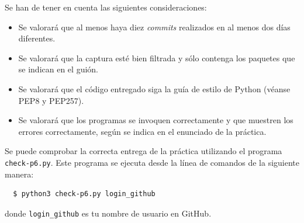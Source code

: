 \documentclass[a4paper,11pt]{article}
\begin{document}
Se han de tener en cuenta las siguientes consideraciones:
\begin{itemize}
  \item Se valorará que al menos haya diez \emph{commits} realizados en al menos dos días diferentes.
  \item Se valorará que la captura esté bien filtrada y sólo contenga los paquetes que se indican en el guión.
  \item Se valorará que el código entregado siga la guía de estilo de Python (véanse PEP8 y PEP257).
  \item Se valorará que los programas se invoquen correctamente y que muestren los errores correctamente, según se indica en el enunciado de la práctica.
\end{itemize}

Se puede comprobar la correcta entrega de la práctica utilizando el programa \texttt{check-p6.py}. Este programa se ejecuta desde la línea de comandos de la siguiente manera:
\begin{verbatim}
  $ python3 check-p6.py login_github
\end{verbatim}


donde \texttt{login\_github} es tu nombre de usuario en GitHub.



%
%
\end{document}
